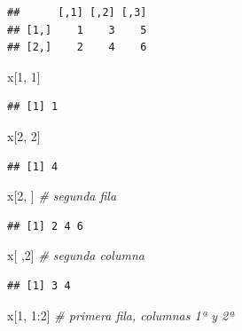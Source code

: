 \documentclass[
]{book}
\newenvironment{Shaded}{\begin{snugshade}}{\end{snugshade}}
\newcommand{\CommentTok}[1]{\textcolor[rgb]{0.56,0.35,0.01}{\textit{#1}}}
\newcommand{\DecValTok}[1]{\textcolor[rgb]{0.00,0.00,0.81}{#1}}
\newcommand{\NormalTok}[1]{#1}
\newcommand{\SpecialCharTok}[1]{\textcolor[rgb]{0.00,0.00,0.00}{#1}}
\theoremstyle{break}
\begin{document}
\begin{verbatim}
##      [,1] [,2] [,3]
## [1,]    1    3    5
## [2,]    2    4    6
\end{verbatim}

\begin{Shaded}
\begin{Highlighting}[]
\NormalTok{x[}\DecValTok{1}\NormalTok{, }\DecValTok{1}\NormalTok{]}
\end{Highlighting}
\end{Shaded}

\begin{verbatim}
## [1] 1
\end{verbatim}

\begin{Shaded}
\begin{Highlighting}[]
\NormalTok{x[}\DecValTok{2}\NormalTok{, }\DecValTok{2}\NormalTok{]}
\end{Highlighting}
\end{Shaded}

\begin{verbatim}
## [1] 4
\end{verbatim}

\begin{Shaded}
\begin{Highlighting}[]
\NormalTok{x[}\DecValTok{2}\NormalTok{, ]  }\CommentTok{\# segunda fila}
\end{Highlighting}
\end{Shaded}

\begin{verbatim}
## [1] 2 4 6
\end{verbatim}

\begin{Shaded}
\begin{Highlighting}[]
\NormalTok{x[ ,}\DecValTok{2}\NormalTok{]  }\CommentTok{\# segunda columna}
\end{Highlighting}
\end{Shaded}

\begin{verbatim}
## [1] 3 4
\end{verbatim}

\begin{Shaded}
\begin{Highlighting}[]
\NormalTok{x[}\DecValTok{1}\NormalTok{, }\DecValTok{1}\SpecialCharTok{:}\DecValTok{2}\NormalTok{]  }\CommentTok{\# primera fila, columnas 1ª y 2ª }
\end{Highlighting}
\end{Shaded}
\end{document}

